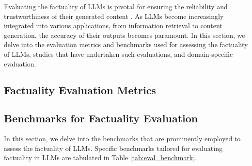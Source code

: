 
Evaluating the factuality of LLMs is pivotal for ensuring the reliability and trustworthiness of their generated content \citep{pezeshkpour2023measuring,lee2022factuality}. As LLMs become increasingly integrated into various applications, from information retrieval to content generation, the accuracy of their outputs becomes paramount. In this section, we delve into the evaluation metrics and benchmarks used for assessing the factuality of LLMs, studies that have undertaken such evaluations, and domain-specific evaluation.



\subsection{Factuality Evaluation Metrics}
\label{sec:eval_metrics}








\subsection{{Benchmarks for Factuality Evaluation}}
\label{sec:eval_benchmark}

In this section, we delve into the benchmarks that are prominently employed to assess the factuality of LLMs.
Specific benchmarks tailored for evaluating factuality in LLMs are tabulated in Table \ref{tab:eval_benchmark}. 




